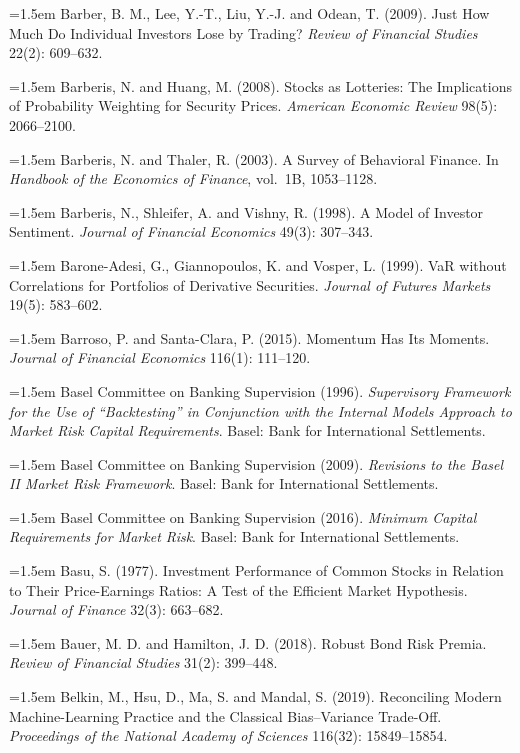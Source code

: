\hangindent=1.5em Barber, B. M., Lee, Y.-T., Liu, Y.-J. and Odean, T. (2009). Just How Much Do Individual Investors Lose by Trading? \emph{Review of Financial Studies} 22(2): 609--632.

\hangindent=1.5em Barberis, N. and Huang, M. (2008). Stocks as Lotteries: The Implications of Probability Weighting for Security Prices. \emph{American Economic Review} 98(5): 2066--2100.

\hangindent=1.5em Barberis, N. and Thaler, R. (2003). A Survey of Behavioral Finance. In \emph{Handbook of the Economics of Finance}, vol.\ 1B, 1053--1128.

\hangindent=1.5em Barberis, N., Shleifer, A. and Vishny, R. (1998). A Model of Investor Sentiment. \emph{Journal of Financial Economics} 49(3): 307--343.

\hangindent=1.5em Barone-Adesi, G., Giannopoulos, K. and Vosper, L. (1999). VaR without Correlations for Portfolios of Derivative Securities. \emph{Journal of Futures Markets} 19(5): 583--602.

\hangindent=1.5em Barroso, P. and Santa-Clara, P. (2015). Momentum Has Its Moments. \emph{Journal of Financial Economics} 116(1): 111--120.

\hangindent=1.5em Basel Committee on Banking Supervision (1996). \emph{Supervisory Framework for the Use of ``Backtesting'' in Conjunction with the Internal Models Approach to Market Risk Capital Requirements}. Basel: Bank for International Settlements.

\hangindent=1.5em Basel Committee on Banking Supervision (2009). \emph{Revisions to the Basel II Market Risk Framework}. Basel: Bank for International Settlements.

\hangindent=1.5em Basel Committee on Banking Supervision (2016). \emph{Minimum Capital Requirements for Market Risk}. Basel: Bank for International Settlements.

\hangindent=1.5em Basu, S. (1977). Investment Performance of Common Stocks in Relation to Their Price-Earnings Ratios: A Test of the Efficient Market Hypothesis. \emph{Journal of Finance} 32(3): 663--682.

\hangindent=1.5em Bauer, M. D. and Hamilton, J. D. (2018). Robust Bond Risk Premia. \emph{Review of Financial Studies} 31(2): 399--448.

\hangindent=1.5em Belkin, M., Hsu, D., Ma, S. and Mandal, S. (2019). Reconciling Modern Machine-Learning Practice and the Classical Bias--Variance Trade-Off. \emph{Proceedings of the National Academy of Sciences} 116(32): 15849--15854.

